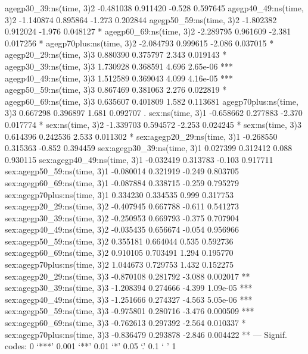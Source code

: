 \documentclass[a4paper]{article}                %
\begin{document}
\begin{Schunk}
\begin{Soutput}
agegp30_39:ns(time, 3)2             -0.481038   0.911420  -0.528 0.597645    
agegp40_49:ns(time, 3)2             -1.140874   0.895864  -1.273 0.202844    
agegp50_59:ns(time, 3)2             -1.802382   0.912024  -1.976 0.048127 *  
agegp60_69:ns(time, 3)2             -2.289795   0.961609  -2.381 0.017256 *  
agegp70plus:ns(time, 3)2            -2.084793   0.999615  -2.086 0.037015 *  
agegp20_29:ns(time, 3)3              0.880390   0.375797   2.343 0.019143 *  
agegp30_39:ns(time, 3)3              1.730928   0.368591   4.696 2.65e-06 ***
agegp40_49:ns(time, 3)3              1.512589   0.369043   4.099 4.16e-05 ***
agegp50_59:ns(time, 3)3              0.867469   0.381063   2.276 0.022819 *  
agegp60_69:ns(time, 3)3              0.635607   0.401809   1.582 0.113681    
agegp70plus:ns(time, 3)3             0.667298   0.396897   1.681 0.092707 .  
sex:ns(time, 3)1                    -0.658662   0.277883  -2.370 0.017774 *  
sex:ns(time, 3)2                    -1.339703   0.594572  -2.253 0.024245 *  
sex:ns(time, 3)3                     0.614396   0.242536   2.533 0.011302 *  
sex:agegp20_29:ns(time, 3)1         -0.268550   0.315363  -0.852 0.394459    
sex:agegp30_39:ns(time, 3)1          0.027399   0.312412   0.088 0.930115    
sex:agegp40_49:ns(time, 3)1         -0.032419   0.313783  -0.103 0.917711    
sex:agegp50_59:ns(time, 3)1         -0.080014   0.321919  -0.249 0.803705    
sex:agegp60_69:ns(time, 3)1         -0.087884   0.338715  -0.259 0.795279    
sex:agegp70plus:ns(time, 3)1         0.334230   0.334535   0.999 0.317753    
sex:agegp20_29:ns(time, 3)2         -0.407945   0.667788  -0.611 0.541273    
sex:agegp30_39:ns(time, 3)2         -0.250953   0.669793  -0.375 0.707904    
sex:agegp40_49:ns(time, 3)2         -0.035435   0.656674  -0.054 0.956966    
sex:agegp50_59:ns(time, 3)2          0.355181   0.664044   0.535 0.592736    
sex:agegp60_69:ns(time, 3)2          0.910105   0.703491   1.294 0.195770    
sex:agegp70plus:ns(time, 3)2         1.044673   0.729753   1.432 0.152275    
sex:agegp20_29:ns(time, 3)3         -0.870108   0.281792  -3.088 0.002017 ** 
sex:agegp30_39:ns(time, 3)3         -1.208394   0.274666  -4.399 1.09e-05 ***
sex:agegp40_49:ns(time, 3)3         -1.251666   0.274327  -4.563 5.05e-06 ***
sex:agegp50_59:ns(time, 3)3         -0.975801   0.280716  -3.476 0.000509 ***
sex:agegp60_69:ns(time, 3)3         -0.762613   0.297392  -2.564 0.010337 *  
sex:agegp70plus:ns(time, 3)3        -0.836479   0.293878  -2.846 0.004422 ** 
---
Signif. codes:  0 ‘***’ 0.001 ‘**’ 0.01 ‘*’ 0.05 ‘.’ 0.1 ‘ ’ 1


\end{Soutput}
\end{Schunk}
\end{document}
